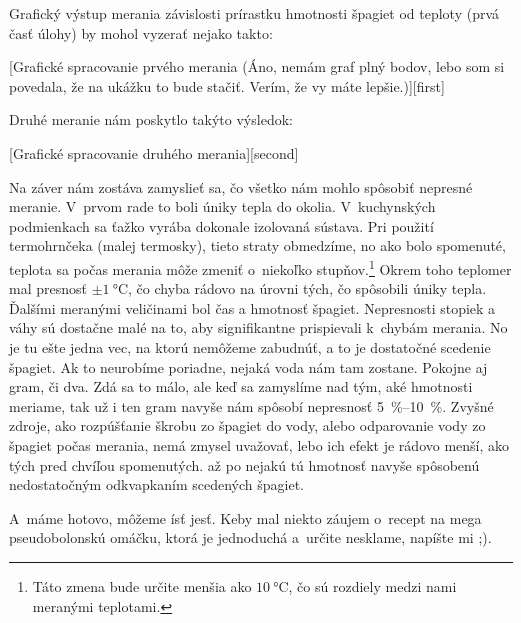 Grafický výstup merania závislosti prírastku hmotnosti špagiet od teploty (prvá časť úlohy) by mohol vyzerať nejako takto: 

[Grafické spracovanie prvého merania (Áno, nemám graf plný bodov, lebo som si povedala, že na ukážku to bude stačiť. Verím, že vy máte lepšie.)][first]

Druhé meranie nám poskytlo takýto výsledok:

[Grafické spracovanie druhého merania][second]



Na záver nám zostáva zamyslieť sa, čo všetko nám mohlo spôsobiť nepresné meranie.
V~prvom rade to boli úniky tepla do okolia. V~kuchynských podmienkach sa ťažko vyrába dokonale izolovaná sústava. 
Pri použití termohrnčeka (malej termosky), tieto straty obmedzíme, no ako bolo spomenuté, teplota sa počas merania môže zmeniť
o~niekoľko stupňov.\footnote{Táto zmena bude určite menšia ako $\SI{10}{\celsius}$, čo sú rozdiely medzi nami 
meranými teplotami.} Okrem toho teplomer mal presnosť $\pm \SI{1}{\celsius}$, čo chyba rádovo na úrovni tých, čo spôsobili 
úniky tepla. 
Ďalšími meranými veličinami bol čas a hmotnosť špagiet. Nepresnosti stopiek a váhy sú dostačne malé na to, 
aby signifikantne prispievali k~chybám merania. No je tu ešte jedna vec, na ktorú nemôžeme zabudnúť, 
a to je dostatočné scedenie špagiet. Ak to neurobíme poriadne, nejaká voda nám tam zostane. Pokojne aj gram, či dva. 
Zdá sa to málo, ale keď sa zamyslíme nad tým, aké hmotnosti meriame, tak už i ten gram navyše nám spôsobí nepresnosť 
\SIrange{5}{10}{\percent}. Zvyšné zdroje, ako rozpúšťanie škrobu zo špagiet do vody, alebo odparovanie vody zo špagiet počas merania,
nemá zmysel uvažovať, lebo ich efekt je rádovo menší, ako tých pred chvíľou spomenutých.
až po nejakú tú hmotnosť navyše spôsobenú nedostatočným odkvapkaním scedených špagiet.

A~máme hotovo, môžeme ísť jesť. Keby mal niekto záujem o~recept na mega pseudobolonskú omáčku, ktorá je jednoduchá a~určite nesklame, napíšte mi ;).
